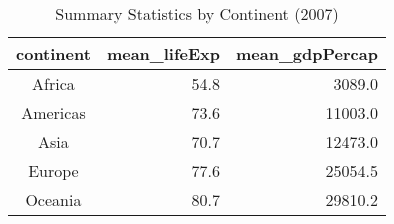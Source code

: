 \begin{table}[!t]
\caption{Summary Statistics by Continent (2007) \label{tab:summary-table}} 
\fontsize{12.0pt}{14.4pt}\selectfont
\begin{tabular*}{\linewidth}{@{\extracolsep{\fill}}crr}
\toprule
continent & mean\_lifeExp & mean\_gdpPercap \\ 
\midrule\addlinespace[2.5pt]
Africa & 54.8 & 3089.0 \\ 
Americas & 73.6 & 11003.0 \\ 
Asia & 70.7 & 12473.0 \\ 
Europe & 77.6 & 25054.5 \\ 
Oceania & 80.7 & 29810.2 \\ 
\bottomrule
\end{tabular*}
\end{table}

